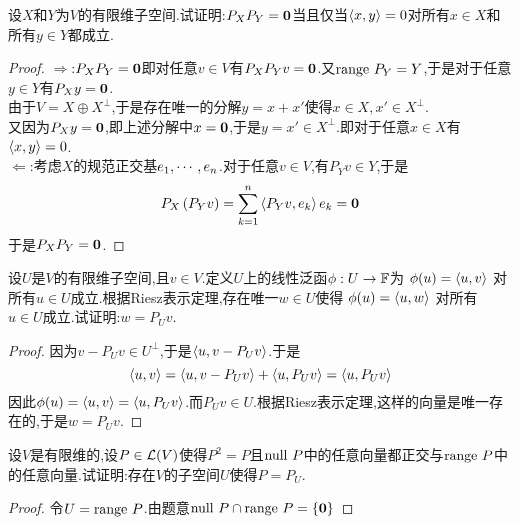 \documentclass{ctexart}
\begin{document}
\begin{problem}[7.]
    设$X$和$Y$为$V$的有限维子空间.试证明:$P_XP_Y=\mathbf0$当且仅当$\left\langle{x},{y}\right\rangle=0$对所有$x\in X$和所有$y\in Y$都成立.
\end{problem}
\begin{proof}
    $\Rightarrow$:$P_XP_Y=\mathbf0$即对任意$v\in V$有$P_XP_Yv=\mathbf0$.又$\text{range } P_Y=Y$,于是对于任意$y\in Y$有$P_Xy=\mathbf0$.\\
    由于$V=X\oplus X^\bot$,于是存在唯一的分解$y=x+x'$使得$x\in X,x'\in X^\bot$.\\
    又因为$P_Xy=\mathbf0$,即上述分解中$x=\mathbf0$,于是$y=x'\in X^\bot$.即对于任意$x\in X$有$\left\langle{x},{y}\right\rangle=0$.\\
    $\Leftarrow$:考虑$X$的规范正交基${e}_1,\cdots,{e}_{n}$.对于任意$v\in V$,有$P_Yv\in Y$,于是
    \[P_X\left(P_Yv\right)=\sum_{k=1}^{n}\left\langle{P_Yv},{e_k}\right\rangle e_k=\mathbf0\]
    于是$P_XP_Y=\mathbf0$.
\end{proof}
\begin{problem}[8.]
    设$U$是$V$的有限维子空间,且$v\in V$.定义$U$上的线性泛函$\phi:U\to\mathbb{F}$为
    \(\phi(u)=\left\langle{u},{v}\right\rangle\)
    对所有$u\in U$成立.根据Riesz表示定理,存在唯一$w\in U$使得
    \(\phi(u)=\left\langle{u},{w}\right\rangle\)
    对所有$u\in U$成立.试证明:$w=P_Uv$.
\end{problem}
\begin{proof}
    因为$v-P_Uv\in U^\bot$,于是$\left\langle{u},{v-P_Uv}\right\rangle$.于是
    \[\left\langle{u},{v}\right\rangle=\left\langle{u},{v-P_Uv}\right\rangle+\left\langle{u},{P_Uv}\right\rangle=\left\langle{u},{P_Uv}\right\rangle\]
    因此$\phi(u)=\left\langle{u},{v}\right\rangle=\left\langle{u},{P_Uv}\right\rangle$.而$P_Uv\in U$.根据Riesz表示定理,这样的向量是唯一存在的,于是$w=P_Uv$.
\end{proof}
\begin{problem}[9.]
    设$V$是有限维的,设$P\in\mathcal{L}(V)$使得$P^2=P$且$\text{null } P$中的任意向量都正交与$\text{range } P$中的任意向量.试证明:存在$V$的子空间$U$使得$P=P_U$.
\end{problem}
\begin{proof}
    令$U=\text{range } P$.由题意$\text{null } P\cap\text{range } P=\{\mathbf0\}$
\end{proof}
\end{document}

